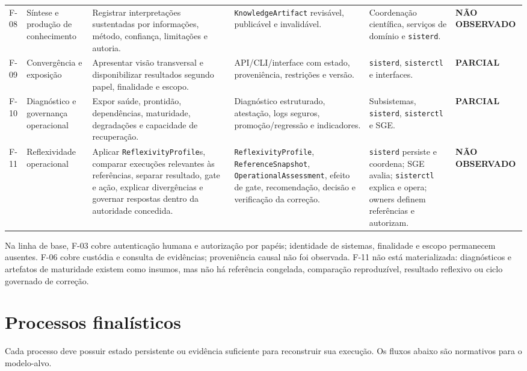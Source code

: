 \documentclass[11pt,a4paper,oneside]{article}
\newcommand{\statusparcial}{\textcolor{sisteramber}{\textbf{PARCIAL}}}
\newcommand{\statusausente}{\textcolor{sisterred}{\textbf{NÃO OBSERVADO}}}
\begin{document}
\begin{landscape}
\begin{longtable}{P{1.35cm}P{3.4cm}P{6.2cm}P{4.8cm}P{3.4cm}P{2.7cm}}
F-08 & Síntese e produção de conhecimento & Registrar interpretações sustentadas por informações, método, confiança, limitações e autoria. & \texttt{KnowledgeArtifact} revisável, publicável e invalidável. & Coordenação científica, serviços de domínio e \texttt{sisterd}. & \statusausente \\
F-09 & Convergência e exposição & Apresentar visão transversal e disponibilizar resultados segundo papel, finalidade e escopo. & API/CLI/interface com estado, proveniência, restrições e versão. & \texttt{sisterd}, \texttt{sisterctl} e interfaces. & \statusparcial \\
F-10 & Diagnóstico e governança operacional & Expor saúde, prontidão, dependências, maturidade, degradações e capacidade de recuperação. & Diagnóstico estruturado, atestação, logs seguros, promoção/regressão e indicadores. & Subsistemas, \texttt{sisterd}, \texttt{sisterctl} e SGE. & \statusparcial \\
F-11 & Reflexividade operacional & Aplicar \texttt{ReflexivityProfile}s, comparar execuções relevantes às referências, separar resultado, gate e ação, explicar divergências e governar respostas dentro da autoridade concedida. & \texttt{ReflexivityProfile}, \texttt{ReferenceSnapshot}, \texttt{OperationalAssessment}, efeito de gate, recomendação, decisão e verificação da correção. & \texttt{sisterd} persiste e coordena; SGE avalia; \texttt{sisterctl} explica e opera; owners definem referências e autorizam. & \statusausente \\
\bottomrule
\end{longtable}
\end{landscape}

Na linha de base, F-03 cobre autenticação humana e autorização por papéis; identidade de sistemas, finalidade e escopo permanecem ausentes. F-06 cobre custódia e consulta de evidências; proveniência causal não foi observada. F-11 não está materializada: diagnósticos e artefatos de maturidade existem como insumos, mas não há referência congelada, comparação reproduzível, resultado reflexivo ou ciclo governado de correção.

\section{Processos finalísticos}

Cada processo deve possuir estado persistente ou evidência suficiente para reconstruir sua execução. Os fluxos abaixo são normativos para o modelo-alvo.
\end{document}
